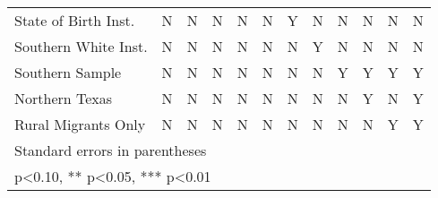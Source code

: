 \begin{table}[htbp]
\begin{tabular}{l*{11}{c}}
State of Birth Inst.&        N   &        N   &        N   &        N   &        N   &        Y   &        N   &        N   &        N   &        N   &        N   \\
Southern White Inst.&        N   &        N   &        N   &        N   &        N   &        N   &        Y   &        N   &        N   &        N   &        N   \\
Southern Sample&        N   &        N   &        N   &        N   &        N   &        N   &        N   &        Y   &        Y   &        Y   &        Y   \\
Northern Texas&        N   &        N   &        N   &        N   &        N   &        N   &        N   &        N   &        Y   &        N   &        Y   \\
Rural Migrants Only&        N   &        N   &        N   &        N   &        N   &        N   &        N   &        N   &        N   &        Y   &        Y   \\
\bottomrule
\multicolumn{12}{l}{\footnotesize Standard errors in parentheses}\\
\multicolumn{12}{l}{\footnotesize * p<0.10, ** p<0.05, *** p<0.01}\\
\end{tabular}
\end{table}
